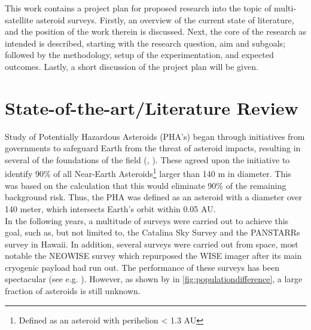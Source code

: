 \documentclass[12pt, english, NoHyper]{AE4010-template}
\begin{document}
This work contains a project plan for proposed research into the topic of multi-satellite asteroid surveys. Firstly, an overview of the current state of literature, and the position of the work therein is discussed. Next, the core of the research as intended is described, starting with the research question, aim and subgoals; followed by the methodology, setup of the experimentation, and expected outcomes. Lastly, a short discussion of the project plan will be given.







\section{State-of-the-art/Literature Review}
Study of Potentially Hazardous Asteroids (PHA's) began through initiatives from governments to safeguard Earth from the threat of asteroid impacts, resulting in several of the foundations of the field (\cite{InitialTaskforce}, \cite{DefendingPlanetEarth}). These agreed upon the initiative to identify 90\% of all Near-Earth Asteroids\footnote{Defined as an asteroid with perihelion < 1.3 AU} larger than 140 m in diameter. This was based on the calculation that this would eliminate 90\% of the remaining background risk. Thus, the PHA was defined as an asteroid with a diameter over 140 meter, which intersects Earth's orbit within 0.05 AU. \\

In the following years, a multitude of surveys were carried out to achieve this goal, such as, but not limited to, the Catalina Sky Survey and the PANSTARRs survey in Hawaii. In addition, several surveys were carried out from space, most notable the NEOWISE survey which repurposed the WISE imager after its main cryogenic payload had run out. The performance of these surveys has been spectacular (see e.g. \cite{NEOWISEFlex}). However, as shown by \cite{PopulationHarris} in \autoref{fig:populationdifference}, a large fraction of asteroids is still unknown.\\
\end{document}
